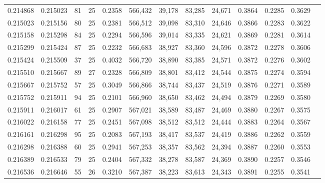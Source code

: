 \begin{tabular}{rrrrrrrrrrrrr}
0.214868 & 0.215023 &    81 &  25 &                                     0.2358 & 566,432 &  39,178 &  83,285 &  24,671 & 0.3864 & 0.2285 & 0.3629 \\
0.215023 & 0.215156 &    80 &  25 &                                     0.2381 & 566,512 &  39,098 &  83,310 &  24,646 & 0.3866 & 0.2283 & 0.3622 \\
0.215158 & 0.215298 &    84 &  25 &                                     0.2294 & 566,596 &  39,014 &  83,335 &  24,621 & 0.3869 & 0.2281 & 0.3614 \\
0.215299 & 0.215424 &    87 &  25 &                                     0.2232 & 566,683 &  38,927 &  83,360 &  24,596 & 0.3872 & 0.2278 & 0.3606 \\
0.215424 & 0.215509 &    37 &  25 &                                     0.4032 & 566,720 &  38,890 &  83,385 &  24,571 & 0.3872 & 0.2276 & 0.3602 \\
0.215510 & 0.215667 &    89 &  27 &                                     0.2328 & 566,809 &  38,801 &  83,412 &  24,544 & 0.3875 & 0.2274 & 0.3594 \\
0.215667 & 0.215752 &    57 &  25 &                                     0.3049 & 566,866 &  38,744 &  83,437 &  24,519 & 0.3876 & 0.2271 & 0.3589 \\
0.215752 & 0.215911 &    94 &  25 &                                     0.2101 & 566,960 &  38,650 &  83,462 &  24,494 & 0.3879 & 0.2269 & 0.3580 \\
0.215911 & 0.216017 &    61 &  25 &                                     0.2907 & 567,021 &  38,589 &  83,487 &  24,469 & 0.3880 & 0.2267 & 0.3575 \\
0.216022 & 0.216158 &    77 &  25 &                                     0.2451 & 567,098 &  38,512 &  83,512 &  24,444 & 0.3883 & 0.2264 & 0.3567 \\
0.216161 & 0.216298 &    95 &  25 &                                     0.2083 & 567,193 &  38,417 &  83,537 &  24,419 & 0.3886 & 0.2262 & 0.3559 \\
0.216298 & 0.216388 &    60 &  25 &                                     0.2941 & 567,253 &  38,357 &  83,562 &  24,394 & 0.3887 & 0.2260 & 0.3553 \\
0.216389 & 0.216533 &    79 &  25 &                                     0.2404 & 567,332 &  38,278 &  83,587 &  24,369 & 0.3890 & 0.2257 & 0.3546 \\
0.216536 & 0.216646 &    55 &  26 &                                     0.3210 & 567,387 &  38,223 &  83,613 &  24,343 & 0.3891 & 0.2255 & 0.3541 \\

\end{tabular}
